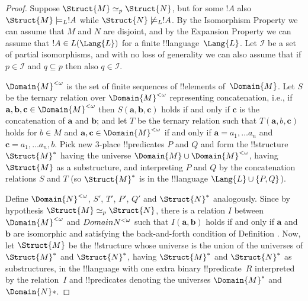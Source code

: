 \documentclass[../../include/open-logic-section]{subfiles}
\begin{document}
\begin{proof}
Suppose $\Struct{M} \simeq_p \Struct{N}$, but for some $!A$ also
$\Struct{M} \models_L !A$ while $\Struct{N} \not\models_L
!A$. By the Isomorphism Property we can assume that $M$ and $N$
are disjoint, and by the Expansion Property we can assume that $!A
\in L(\Lang{L})$ for a finite !!{language}~$\Lang{L}$. Let $\mathcal{I}$
be a set of partial isomorphisms, and with no loss of generality we
can also assume that if $p \in \mathcal{I}$ and $q \subseteq p$ then
also $q \in \mathcal{I}$.

$\Domain{M}^{<\omega}$ is the set of finite sequences of !!{element}s
of~$\Domain{M}$. Let $S$ be the ternary relation over $\Domain{M}^{<\omega}$
representing concatenation, i.e., if $\mathbf{a}, \mathbf{b},
\mathbf{c} \in \Domain{M}^{<\omega}$ then $S(\mathbf{a}, \mathbf{b},
\mathbf{c})$ holds if and only if $\mathbf{c}$ is the concatenation of
$\mathbf{a}$ and $\mathbf{b}$; and let $T$ be the ternary relation
such that $T(\mathbf{a}, b, \mathbf{c})$ holds for $b \in M$ and
$\mathbf{a}, \mathbf{c} \in \Domain{M}^{<\omega}$ if and only if $\mathbf{a} =
a_1, \dots a_n$ and $\mathbf{c} = a_1, \dots a_n, b$.  Pick new
3-place !!{predicate}s $P$ and $Q$ and form the !!{structure}
$\Struct{M}^*$ having the universe $\Domain{M} \cup \Domain{M}^{<\omega}$, having
$\Struct{M}$ as a substructure, and interpreting $P$ and $Q$ by the
concatenation relations $S$ and $T$ (so $\Struct{M}^*$ is in the
!!{language} $\Lang{L} \cup \{ P, Q\}$).

Define $\Domain{N}^{<\omega}$, $S'$, $T'$, $P'$, $Q'$ and
$\Struct{N}^*$ analogously. Since by hypothesis $\Struct{M} \simeq_p
\Struct{N}$, there is a relation $I$ between $\Domain{M}^{<\omega}$
and $\\Domain{N}^{<\omega}$ such that $I(\mathbf{a}, \mathbf{b})$
holds if and only if $\mathbf{a}$ and $\mathbf{b}$ are isomorphic and
satisfying the back-and-forth condition of Definition
.  Now, let $\Struct{M}$ be the
!!{structure} whose universe is the union of the universes of
$\Struct{M}^*$ and $\Struct{N}^*$, having $\Struct{M}^*$ and
$\Struct{N}^*$ as substructures, in the !!{language} with one extra
binary !!{predicate}~$R$ interpreted by the relation~$I$ and
!!{predicate}s denoting the universes $\Domain{M}^*$
and~$\Domain{N}*$.


\end{proof}
\end{document}
